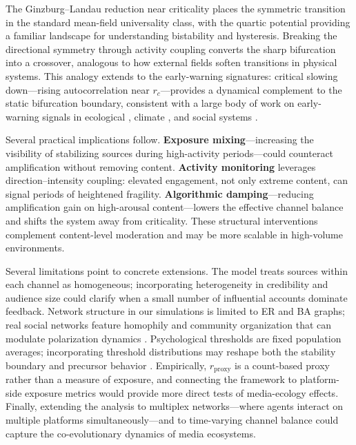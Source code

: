 \documentclass[preprint,12pt]{elsarticle}
\begin{document}
The Ginzburg--Landau reduction near criticality places the symmetric transition in the standard mean-field universality class, with the quartic potential providing a familiar landscape for understanding bistability and hysteresis. Breaking the directional symmetry through activity coupling converts the sharp bifurcation into a crossover, analogous to how external fields soften transitions in physical systems. This analogy extends to the early-warning signatures: critical slowing down---rising autocorrelation near $r_c$---provides a dynamical complement to the static bifurcation boundary, consistent with a large body of work on early-warning signals in ecological \cite{Scheffer2009,Scheffer2012}, climate \cite{Lenton2012RSTA}, and social systems \cite{Bury2021}.

Several practical implications follow. \textbf{Exposure mixing}---increasing the visibility of stabilizing sources during high-activity periods---could counteract amplification without removing content. \textbf{Activity monitoring} leverages direction--intensity coupling: elevated engagement, not only extreme content, can signal periods of heightened fragility. \textbf{Algorithmic damping}---reducing amplification gain on high-arousal content---lowers the effective channel balance and shifts the system away from criticality. These structural interventions complement content-level moderation and may be more scalable in high-volume environments.

Several limitations point to concrete extensions. The model treats sources within each channel as homogeneous; incorporating heterogeneity in credibility and audience size could clarify when a small number of influential accounts dominate feedback. Network structure in our simulations is limited to ER and BA graphs; real social networks feature homophily and community organization that can modulate polarization dynamics \cite{McPherson2001,Dandekar2013}. Psychological thresholds are fixed population averages; incorporating threshold distributions may reshape both the stability boundary and precursor behavior \cite{Schwartz2013,Pfefferbaum2020}. Empirically, $r_{\text{proxy}}$ is a count-based proxy rather than a measure of exposure, and connecting the framework to platform-side exposure metrics would provide more direct tests of media-ecology effects. Finally, extending the analysis to multiplex networks---where agents interact on multiple platforms simultaneously---and to time-varying channel balance could capture the co-evolutionary dynamics of media ecosystems.
\end{document}
